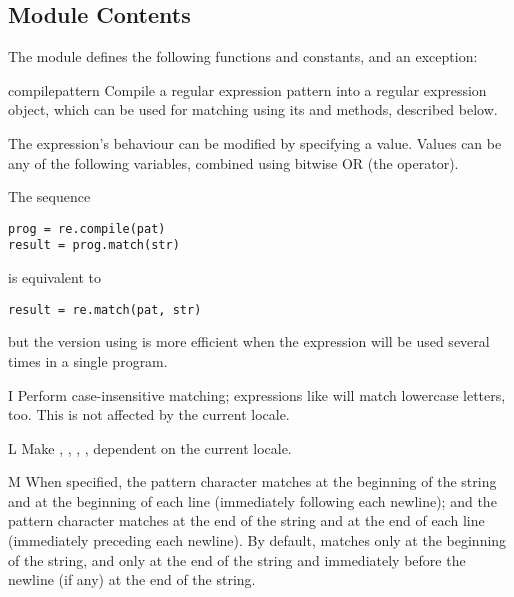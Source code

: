 \subsection{Module Contents}

The module defines the following functions and constants, and an exception:


\begin{funcdesc}{compile}{pattern}
  Compile a regular expression pattern into a regular expression
  object, which can be used for matching using its  and
   methods, described below.  

  The expression's behaviour can be modified by specifying a
   value.  Values can be any of the following variables,
  combined using bitwise OR (the \code{|} operator).

The sequence

\begin{verbatim}
prog = re.compile(pat)
result = prog.match(str)
\end{verbatim}

is equivalent to

\begin{verbatim}
result = re.match(pat, str)
\end{verbatim}

but the version using  is more efficient when the
expression will be used several times in a single program.
\end{funcdesc}

\begin{datadesc}{I}
Perform case-insensitive matching; expressions like \regexp{[A-Z]} will match
lowercase letters, too.  This is not affected by the current locale.
\end{datadesc}

\begin{datadesc}{L}
Make , , ,
, dependent on the current locale. 
\end{datadesc}

\begin{datadesc}{M}
When specified, the pattern character \character{\^} matches at the
beginning of the string and at the beginning of each line
(immediately following each newline); and the pattern character
\character{\$} matches at the end of the string and at the end of each line
(immediately preceding each newline).
By default, \character{\^} matches only at the beginning of the string, and
\character{\$} only at the end of the string and immediately before the
newline (if any) at the end of the string. 
\end{datadesc}

